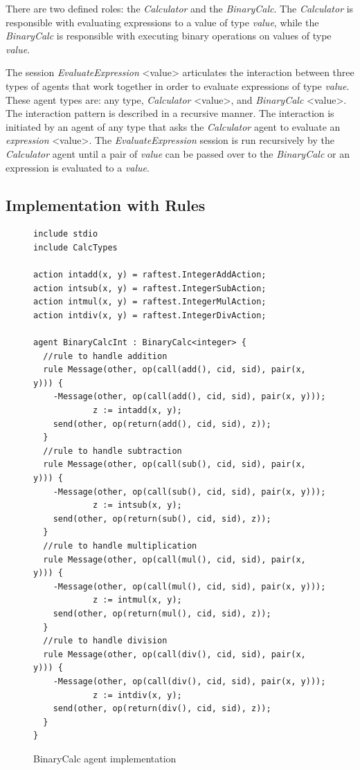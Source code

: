\documentclass[a4paper,12pt,oneside,fleqn]{book} %
\begin{document}
There are two defined roles: the \textit{Calculator} and the
\textit{BinaryCalc}. The \textit{Calculator} is responsible with evaluating
expressions to a value of type \textit{value}, while the
\textit{BinaryCalc} is responsible with executing binary operations on
values of type \textit{value}.

The session \textit{EvaluateExpression} <value> articulates the interaction
between three types of agents that work together in order to evaluate
expressions of type \textit{value}. These agent types are: any type,
\textit{Calculator} <value>, and \textit{BinaryCalc} <value>. The
interaction pattern is described in a recursive manner. The interaction is
initiated by an agent of any type that asks the \textit{Calculator} agent
to evaluate an \textit{expression} <value>. The \textit{EvaluateExpression}
session is run recursively by the \textit{Calculator} agent until a pair of
\textit{value} can be passed over to the \textit{BinaryCalc} or an
expression is evaluated to a \textit{value}.
\subsection{Implementation with Rules} %
\begin{figure}\footnotesize %
\begin{verbatim}
include stdio
include CalcTypes

action intadd(x, y) = raftest.IntegerAddAction;
action intsub(x, y) = raftest.IntegerSubAction;
action intmul(x, y) = raftest.IntegerMulAction;
action intdiv(x, y) = raftest.IntegerDivAction;

agent BinaryCalcInt : BinaryCalc<integer> {
  //rule to handle addition
  rule Message(other, op(call(add(), cid, sid), pair(x, y))) {
    -Message(other, op(call(add(), cid, sid), pair(x, y)));
            z := intadd(x, y);
    send(other, op(return(add(), cid, sid), z));
  }
  //rule to handle subtraction
  rule Message(other, op(call(sub(), cid, sid), pair(x, y))) {
    -Message(other, op(call(sub(), cid, sid), pair(x, y)));
            z := intsub(x, y);
    send(other, op(return(sub(), cid, sid), z));
  }
  //rule to handle multiplication
  rule Message(other, op(call(mul(), cid, sid), pair(x, y))) {
    -Message(other, op(call(mul(), cid, sid), pair(x, y)));
            z := intmul(x, y);
    send(other, op(return(mul(), cid, sid), z));
  }
  //rule to handle division
  rule Message(other, op(call(div(), cid, sid), pair(x, y))) {
    -Message(other, op(call(div(), cid, sid), pair(x, y)));
            z := intdiv(x, y);
    send(other, op(return(div(), cid, sid), z));
  }
}
\end{verbatim}
\caption{BinaryCalc agent implementation}
\label{fig:bcalc-rules}
\end{figure} %
\end{document}
